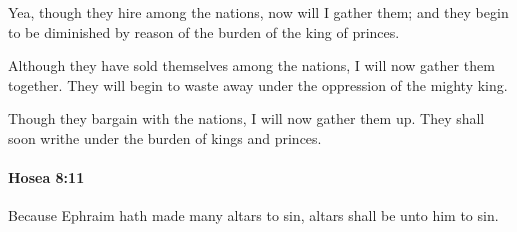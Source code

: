 			\begin{versebox}
					\item[BHS] 
					\item[LXX] 
					\item[ASV] Yea, though they hire among the nations, now will I gather them; and they begin to be diminished by reason of the burden of the king of princes.
					\item[NIV] Although they have sold themselves among the nations, I will now gather them together. They will begin to waste away under the oppression of the mighty king.
					\item[NRSV] Though they bargain with the nations, I will now gather them up. They shall soon writhe under the burden of kings and princes.
			\end{versebox}

		\paragraph{Hosea 8:11} %
			\label{HOSEA-8-11}

			Because Ephraim hath made many altars to sin, altars shall be unto him to sin.


